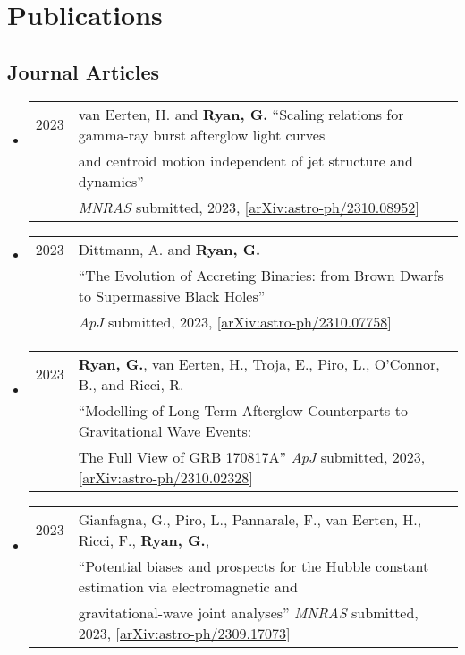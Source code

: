 \section*{Publications}
\subsection*{Journal Articles}
\begin{itemize}
\item \begin{tabular}{ll}
2023 & {van Eerten}, H. and {\bf {Ryan}, G.}  ``Scaling relations for gamma-ray burst afterglow light curves \\
	& and centroid motion independent of jet structure and dynamics'' \\
	& \emph{MNRAS} submitted, 2023, [\href{https://arxiv.org/abs/2310.08952}{arXiv:astro-ph/2310.08952}]\\
\end{tabular}

\item \begin{tabular}{ll}
2023 & {Dittmann}, A. and {\bf {Ryan}, G.}\\
	& ``The Evolution of Accreting Binaries: from Brown Dwarfs to Supermassive Black Holes'' \\
	& \emph{ApJ} submitted, 2023, [\href{https://arxiv.org/abs/2310.07758}{arXiv:astro-ph/2310.07758}]\\
\end{tabular}

\item \begin{tabular}{ll}
2023 & {\bf {Ryan}, G.}, {van Eerten}, H., {Troja}, E., {Piro}, L., {O'Connor}, B., and {Ricci}, R. \\
	& ``Modelling of Long-Term Afterglow Counterparts to Gravitational Wave Events: \\
	& The Full View of GRB 170817A''  \emph{ApJ} submitted, 2023, [\href{https://arxiv.org/abs/2310.02328}{arXiv:astro-ph/2310.02328}]\\
\end{tabular}

\item \begin{tabular}{ll}
2023 & {Gianfagna}, G., {Piro}, L., {Pannarale}, F., {van Eerten}, H., {Ricci}, F., {\bf {Ryan}, G.}, \\
	& ``Potential biases and prospects for the Hubble constant estimation via electromagnetic and \\
	& gravitational-wave joint analyses'' \emph{MNRAS} submitted, 2023, [\href{https://arxiv.org/abs/2309.17073}{arXiv:astro-ph/2309.17073}]\\
\end{tabular}


\end{itemize}
